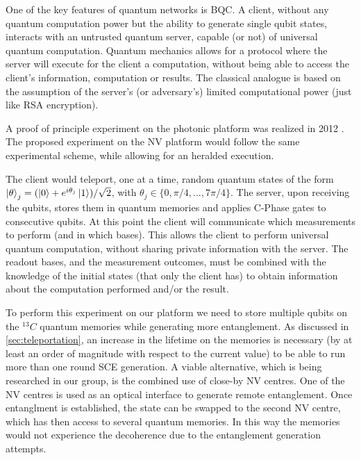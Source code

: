 \documentclass[a4paper, twoside]{article}
\begin{document}
One of the key features of quantum networks is \ac{BQC}. A client, without any quantum computation power but the ability to generate single qubit states, interacts with an untrusted quantum server, capable (or not) of universal quantum computation. Quantum mechanics allows for a protocol where the server will execute for the client a computation, without being able to access the client's information, computation or results. The classical analogue is based on the assumption of the server's (or adversary's) limited computational power (just like RSA encryption).

A proof of principle experiment on the photonic platform was realized in 2012 \cite{Barz2012}. The proposed experiment on the NV platform would follow the same experimental scheme, while allowing for an heralded execution.

The client would teleport, one at a time, random quantum states of the form $\ket\theta_j = (\ket 0 + e^{i \theta_j}\ket 1)/\sqrt 2$, with $\theta_j \in \lbrace0, \pi/4,\ldots,7\pi/4\rbrace$. The server, upon receiving the qubits, stores them in quantum memories and applies C-Phase gates to consecutive qubits.
At this point the client will communicate which measurements to perform (and in which bases). This allows the client to perform universal quantum computation, without sharing private information with the server. The readout bases, and the measurement outcomes, must be combined with the knowledge of the initial states (that only the client has) to obtain information about the computation performed and/or the result.

To perform this experiment on our platform we need to store multiple qubits on the ${}^{13}C$ quantum memories while generating more entanglement. As discussed in \autoref{sec:teleportation}, an increase in the lifetime on the memories is necessary (by at least an order of magnitude with respect to the current value) to be able to run more than one round \ac{SCE} generation. 
A viable alternative, which is being researched in our group, is the combined use of close-by NV centres. One of the NV centres is used as an optical interface to generate remote entanglement. Once entanglment is established, the state can be swapped to the second NV centre, which has then access to several quantum memories. In this way the memories would not experience the decoherence due to the entanglement generation attempts.
\end{document}
